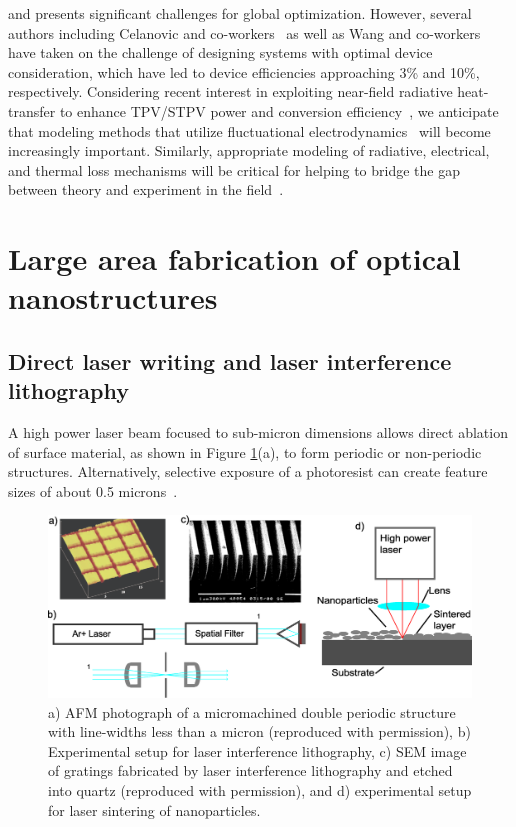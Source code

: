 \documentclass[review]{elsarticle}
\begin{document}
and presents significant challenges for global optimization.  
However, several authors including Celanovic and co-workers~\cite{g4}
as well as Wang and co-workers~\cite{g9} have taken on the challenge of designing systems with optimal device consideration, which have led to device efficiencies approaching 3\% and 
10\%, respectively. Considering recent interest in exploiting near-field radiative heat-transfer to enhance
TPV/STPV power and conversion efficiency~\cite{SZF_NatNano_2016, KJ_SciRep_2016}, we anticipate that modeling methods that utilize
fluctuational electrodynamics~\cite{rodriguez2011,datas2013,didari2014,didari2015,edalatpour2014} will become increasingly important.
Similarly, appropriate modeling of radiative, electrical, and thermal loss mechanisms will be critical for helping to bridge
the gap between theory and experiment in the field~\cite{BDB_SciRep_2015}.
  
\section{Large area fabrication of optical nanostructures}
\subsection{Direct laser writing and laser interference lithography}
A high power laser beam focused to sub-micron dimensions allows direct 
ablation of surface material,  as shown in Figure \ref{gfig12_comb}(a), to form periodic or non-periodic structures.   Alternatively, selective exposure of a 
photoresist can create feature sizes of about 0.5 microns~\cite{g29}. 

\begin{figure}[ht]
	\includegraphics[width=\textwidth]{gfig12_comb}
	\caption{\label{gfig12_comb} a) AFM photograph of a micromachined double periodic structure with line-widths less than a micron \cite{g29} (reproduced with permission), b) Experimental setup for laser interference lithography, c) SEM image of gratings fabricated by laser interference lithography and etched into quartz \cite{g30} (reproduced with permission), and d) experimental setup for laser sintering of nanoparticles.} %
\end{figure}
\end{document}
